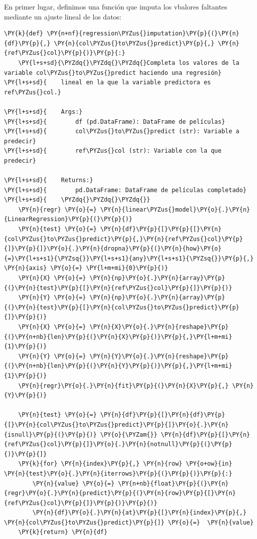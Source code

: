     En primer lugar, definimos una función que imputa los vbalores faltantes
mediante un ajuste lineal de los datos:

    \begin{tcolorbox}[breakable, size=fbox, boxrule=1pt, pad at break*=1mm,colback=cellbackground, colframe=cellborder]
\begin{Verbatim}[commandchars=\\\{\}]
\PY{k}{def} \PY{n+nf}{regression\PYZus{}imputation}\PY{p}{(}\PY{n}{df}\PY{p}{,} \PY{n}{col\PYZus{}to\PYZus{}predict}\PY{p}{,} \PY{n}{ref\PYZus{}col}\PY{p}{)}\PY{p}{:}
    \PY{l+s+sd}{\PYZdq{}\PYZdq{}\PYZdq{}Completa los valores de la variable col\PYZus{}to\PYZus{}predict haciendo una regresión}
\PY{l+s+sd}{    lineal en la que la variable predictora es ref\PYZus{}col.}

\PY{l+s+sd}{    Args:}
\PY{l+s+sd}{        df (pd.DataFrame): DataFrame de películas}
\PY{l+s+sd}{        col\PYZus{}to\PYZus{}predict (str): Variable a predecir}
\PY{l+s+sd}{        ref\PYZus{}col (str): Variable con la que predecir}

\PY{l+s+sd}{    Returns:}
\PY{l+s+sd}{        pd.DataFrame: DataFrame de películas completado}
\PY{l+s+sd}{    \PYZdq{}\PYZdq{}\PYZdq{}}
    \PY{n}{regr} \PY{o}{=} \PY{n}{linear\PYZus{}model}\PY{o}{.}\PY{n}{LinearRegression}\PY{p}{(}\PY{p}{)}
    \PY{n}{test} \PY{o}{=} \PY{n}{df}\PY{p}{[}\PY{p}{[}\PY{n}{col\PYZus{}to\PYZus{}predict}\PY{p}{,}\PY{n}{ref\PYZus{}col}\PY{p}{]}\PY{p}{]}\PY{o}{.}\PY{n}{dropna}\PY{p}{(}\PY{n}{how}\PY{o}{=}\PY{l+s+s1}{\PYZsq{}}\PY{l+s+s1}{any}\PY{l+s+s1}{\PYZsq{}}\PY{p}{,} \PY{n}{axis} \PY{o}{=} \PY{l+m+mi}{0}\PY{p}{)}
    \PY{n}{X} \PY{o}{=} \PY{n}{np}\PY{o}{.}\PY{n}{array}\PY{p}{(}\PY{n}{test}\PY{p}{[}\PY{n}{ref\PYZus{}col}\PY{p}{]}\PY{p}{)}
    \PY{n}{Y} \PY{o}{=} \PY{n}{np}\PY{o}{.}\PY{n}{array}\PY{p}{(}\PY{n}{test}\PY{p}{[}\PY{n}{col\PYZus{}to\PYZus{}predict}\PY{p}{]}\PY{p}{)}
    \PY{n}{X} \PY{o}{=} \PY{n}{X}\PY{o}{.}\PY{n}{reshape}\PY{p}{(}\PY{n+nb}{len}\PY{p}{(}\PY{n}{X}\PY{p}{)}\PY{p}{,}\PY{l+m+mi}{1}\PY{p}{)}
    \PY{n}{Y} \PY{o}{=} \PY{n}{Y}\PY{o}{.}\PY{n}{reshape}\PY{p}{(}\PY{n+nb}{len}\PY{p}{(}\PY{n}{Y}\PY{p}{)}\PY{p}{,}\PY{l+m+mi}{1}\PY{p}{)}
    \PY{n}{regr}\PY{o}{.}\PY{n}{fit}\PY{p}{(}\PY{n}{X}\PY{p}{,} \PY{n}{Y}\PY{p}{)}

    \PY{n}{test} \PY{o}{=} \PY{n}{df}\PY{p}{[}\PY{n}{df}\PY{p}{[}\PY{n}{col\PYZus{}to\PYZus{}predict}\PY{p}{]}\PY{o}{.}\PY{n}{isnull}\PY{p}{(}\PY{p}{)} \PY{o}{\PYZam{}} \PY{n}{df}\PY{p}{[}\PY{n}{ref\PYZus{}col}\PY{p}{]}\PY{o}{.}\PY{n}{notnull}\PY{p}{(}\PY{p}{)}\PY{p}{]}
    \PY{k}{for} \PY{n}{index}\PY{p}{,} \PY{n}{row} \PY{o+ow}{in} \PY{n}{test}\PY{o}{.}\PY{n}{iterrows}\PY{p}{(}\PY{p}{)}\PY{p}{:}
        \PY{n}{value} \PY{o}{=} \PY{n+nb}{float}\PY{p}{(}\PY{n}{regr}\PY{o}{.}\PY{n}{predict}\PY{p}{(}\PY{n}{row}\PY{p}{[}\PY{n}{ref\PYZus{}col}\PY{p}{]}\PY{p}{)}\PY{p}{)}
        \PY{n}{df}\PY{o}{.}\PY{n}{at}\PY{p}{[}\PY{n}{index}\PY{p}{,} \PY{n}{col\PYZus{}to\PYZus{}predict}\PY{p}{]} \PY{o}{=}  \PY{n}{value}
    \PY{k}{return} \PY{n}{df}
\end{Verbatim}
\end{tcolorbox}

